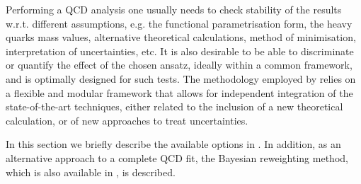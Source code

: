 


Performing a QCD analysis one usually needs to check stability of the results
w.r.t. different assumptions,
e.g. the functional parametrisation form, the heavy quarks mass values, alternative theoretical calculations,
method of minimisation, interpretation of uncertainties, etc.
%
 It is also desirable to be able to discriminate or quantify the effect of the chosen ansatz, ideally within a common framework, and 
\fitter is optimally designed for such tests.
%
The methodology employed by \fitter  relies on a flexible and modular
framework that allows for independent integration of the state-of-the-art techniques, either related to the inclusion of a new theoretical calculation, or of new approaches to treat uncertainties. 

In this section we briefly describe the available options in \fitter.
%
In addition, as an alternative approach to a complete QCD fit, the Bayesian reweighting
method, which is also available in \fitter, is described.



